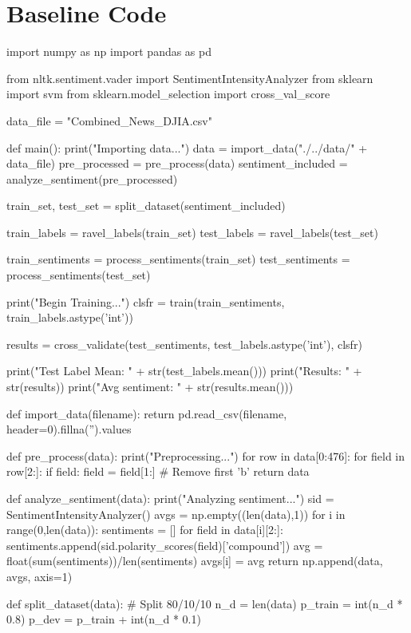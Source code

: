 \documentclass{article} %
\begin{document}
\pagebreak

\section{Baseline Code}

\begin{python}
import numpy as np
import pandas as pd

from nltk.sentiment.vader import SentimentIntensityAnalyzer
from sklearn import svm
from sklearn.model_selection import cross_val_score

data_file = "Combined_News_DJIA.csv"

def main():
  print("Importing data...")
  data = import_data("./../data/" + data_file)
  pre_processed = pre_process(data)
  sentiment_included = analyze_sentiment(pre_processed)

  train_set, test_set = split_dataset(sentiment_included)

  train_labels = ravel_labels(train_set)
  test_labels = ravel_labels(test_set)

  train_sentiments = process_sentiments(train_set)
  test_sentiments = process_sentiments(test_set)

  print("Begin Training...")
  clsfr = train(train_sentiments, train_labels.astype('int'))

  results = cross_validate(test_sentiments, test_labels.astype('int'), clsfr)

  print("Test Label Mean: " + str(test_labels.mean()))
  print("Results: " + str(results))
  print("Avg sentiment: " + str(results.mean()))

def import_data(filename):
  return pd.read_csv(filename, header=0).fillna('').values

def pre_process(data):
  print("Preprocessing...")
  for row in data[0:476]:
    for field in row[2:]:
      if field:
        field = field[1:] # Remove first 'b'
  return data

def analyze_sentiment(data):
  print("Analyzing sentiment...")
  sid = SentimentIntensityAnalyzer()
  avgs = np.empty((len(data),1))
  for i in range(0,len(data)):
    sentiments = []
    for field in data[i][2:]:
      sentiments.append(sid.polarity_scores(field)['compound'])
    avg = float(sum(sentiments))/len(sentiments)
    avgs[i] = avg
  return np.append(data, avgs, axis=1)

def split_dataset(data):
  # Split 80/10/10
  n_d = len(data)
  p_train = int(n_d * 0.8)
  p_dev = p_train + int(n_d * 0.1)


\end{python}
\end{document}
